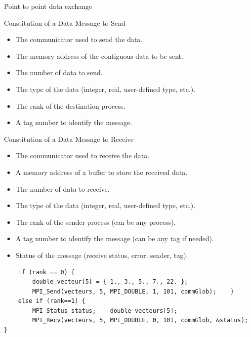 \documentclass[compress,10pt,aspectratio=169]{beamer}
\begin{document}
\begin{frame}[fragile]{Point to point data exchange}
    \scriptsize
    \begin{multicols}{2}
        \begin{block}{\small Constitution of a Data Message to Send}
            \begin{itemize}
                \item The communicator used to send the data.
                \item The memory address of the contiguous data to be sent.
                \item The number of data to send.
                \item The type of the data (integer, real, user-defined type, etc.).
                \item The rank of the destination process.
                \item A tag number to identify the message.
            \end{itemize}
        \end{block}
        
        \begin{block}{\small Constitution of a Data Message to Receive}
            \begin{itemize}
                \item The communicator used to receive the data.
                \item A memory address of a buffer to store the received data.
                \item The number of data to receive.
                \item The type of the data (integer, real, user-defined type, etc.).
                \item The rank of the sender process (can be any process).
                \item A tag number to identify the message (can be any tag if needed).
                \item Status of the message (receive status, error, sender, tag).
            \end{itemize}
        \end{block}
    \end{multicols}

\begin{verbatim}
    if (rank == 0) {
        double vecteur[5] = { 1., 3., 5., 7., 22. };
        MPI_Send(vecteurs, 5, MPI_DOUBLE, 1, 101, commGlob);    }
    else if (rank==1) {
        MPI_Status status;    double vecteurs[5];
        MPI_Recv(vecteurs, 5, MPI_DOUBLE, 0, 101, commGlob, &status);    }
\end{verbatim}

\end{frame}
\end{document}
